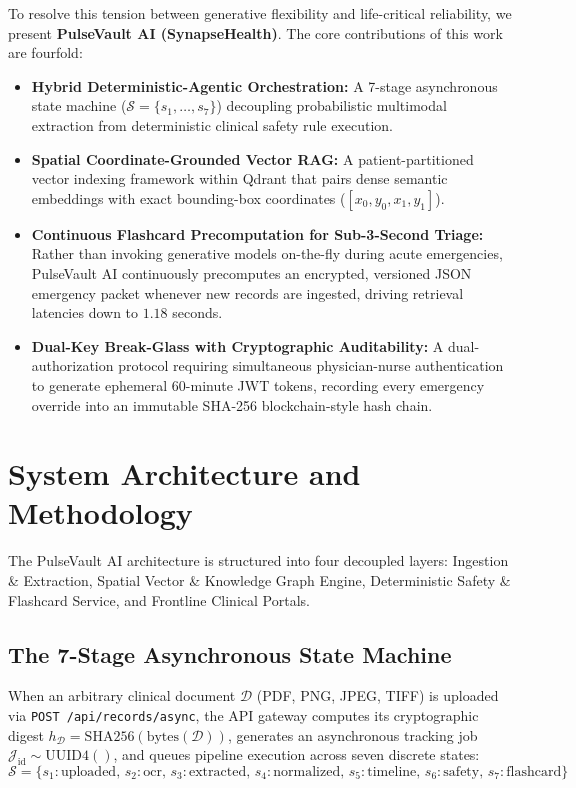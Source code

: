\documentclass[journal]{IEEEtran}
\begin{document}
To resolve this tension between generative flexibility and life-critical reliability, we present \textbf{PulseVault AI (SynapseHealth)}. The core contributions of this work are fourfold:
\begin{itemize}
    \item \textbf{Hybrid Deterministic-Agentic Orchestration:} A 7-stage asynchronous state machine ($\mathcal{S} = \{s_1, \dots, s_7\}$) decoupling probabilistic multimodal extraction from deterministic clinical safety rule execution.
    \item \textbf{Spatial Coordinate-Grounded Vector RAG:} A patient-partitioned vector indexing framework within Qdrant that pairs dense semantic embeddings with exact bounding-box coordinates ($[x_0, y_0, x_1, y_1]$).
    \item \textbf{Continuous Flashcard Precomputation for Sub-3-Second Triage:} Rather than invoking generative models on-the-fly during acute emergencies, PulseVault AI continuously precomputes an encrypted, versioned JSON emergency packet whenever new records are ingested, driving retrieval latencies down to $1.18$ seconds.
    \item \textbf{Dual-Key Break-Glass with Cryptographic Auditability:} A dual-authorization protocol requiring simultaneous physician-nurse authentication to generate ephemeral 60-minute JWT tokens, recording every emergency override into an immutable SHA-256 blockchain-style hash chain.
\end{itemize}

\section{System Architecture and Methodology}
The PulseVault AI architecture is structured into four decoupled layers: Ingestion \& Extraction, Spatial Vector \& Knowledge Graph Engine, Deterministic Safety \& Flashcard Service, and Frontline Clinical Portals.

\subsection{The 7-Stage Asynchronous State Machine}
When an arbitrary clinical document $\mathcal{D}$ (PDF, PNG, JPEG, TIFF) is uploaded via \texttt{POST /api/records/async}, the API gateway computes its cryptographic digest $h_{\mathcal{D}} = \text{SHA256}(\text{bytes}(\mathcal{D}))$, generates an asynchronous tracking job $\mathcal{J}_{\text{id}} \sim \text{UUID4}()$, and queues pipeline execution across seven discrete states:
\begin{equation}
\mathcal{S} = \{ s_1: \text{uploaded}, \, s_2: \text{ocr}, \, s_3: \text{extracted}, \, s_4: \text{normalized}, \, s_5: \text{timeline}, \, s_6: \text{safety}, \, s_7: \text{flashcard} \}
\end{equation}
\end{document}
